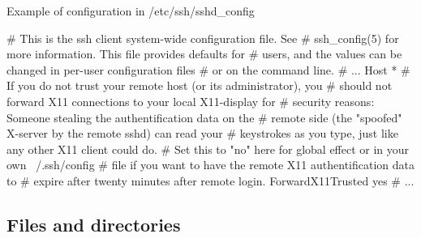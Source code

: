 \documentclass[compress, ucs, xelatex, 11pt, xcolor=svgnames, aspectratio=169,
	hyperref={
		bookmarks=true,
		unicode=true,
		colorlinks=true,
		pdftitle={Linux, command line and MetaCentrum},
		plainpages=false,
		pdfauthor={Vojtech Zeisek},
		pdfsubject={Course about use of Linux command line, writing shell scripts and using MetaCentrum of CESNET},
		pdfcreator={XeLaTeX},
		pdfkeywords={Linux, GNU, BASH, shell, command line, MetaCentrum},
		linkcolor=DarkRed, %
		anchorcolor=DarkBlue, %
		citecolor=Indigo, %
		filecolor=NavyBlue, %
		menucolor=DarkMagenta, %
		urlcolor=DarkBlue, %
		pdftex},
	url={hyphens, lowtilde} %
	]{beamer}
\begin{document}
\begin{frame}[fragile]{Example of configuration in /etc/ssh/sshd\_config}
	\begin{bashcode}
    # This is the ssh client system-wide configuration file.  See
    # ssh_config(5) for more information.  This file provides defaults for
    # users, and the values can be changed in per-user configuration files
    # or on the command line.
    # ...
    Host *
    # If you do not trust your remote host (or its administrator), you
    # should not forward X11 connections to your local X11-display for
    # security reasons: Someone stealing the authentification data on the
    # remote side (the "spoofed" X-server by the remote sshd) can read your
    # keystrokes as you type, just like any other X11 client could do.
    # Set this to "no" here for global effect or in your own ~/.ssh/config
    # file if you want to have the remote X11 authentification data to
    # expire after twenty minutes after remote login.
    ForwardX11Trusted yes
    # ...
	\end{bashcode}
\end{frame}

\subsection{Files and directories}
\end{document}
